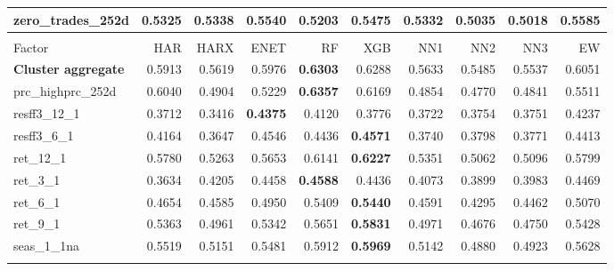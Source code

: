 \begin{longtable}{>{\raggedright\arraybackslash}p{2.6cm}rrrrrrrrr}
zero\_trades\_252d & 0.5325 & \cellcolor{blue!10}0.5338 & \cellcolor{blue!10}0.5540 & 0.5203 & \cellcolor{blue!10}0.5475 & \cellcolor{blue!10}0.5332 & 0.5035 & 0.5018 & \textbf{\cellcolor{blue!10}0.5585} \\
\hline
\multicolumn{10}{@{}l}{\textit{Panel F. Momentum}} \\
\hline
Factor & HAR & HARX & ENET & RF & XGB & NN1 & NN2 & NN3 & EW \\
\hline
\textbf{Cluster aggregate} & 0.5913 & 0.5619 & \cellcolor{blue!10}0.5976 & \textbf{\cellcolor{blue!10}0.6303} & \cellcolor{blue!10}0.6288 & 0.5633 & 0.5485 & 0.5537 & \cellcolor{blue!10}0.6051 \\
prc\_highprc\_252d & 0.6040 & 0.4904 & 0.5229 & \textbf{\cellcolor{blue!10}0.6357} & \cellcolor{blue!10}0.6169 & 0.4854 & 0.4770 & 0.4841 & 0.5511 \\
resff3\_12\_1 & 0.3712 & 0.3416 & \textbf{\cellcolor{blue!10}0.4375} & \cellcolor{blue!10}0.4120 & \cellcolor{blue!10}0.3776 & \cellcolor{blue!10}0.3722 & \cellcolor{blue!10}0.3754 & \cellcolor{blue!10}0.3751 & \cellcolor{blue!10}0.4237 \\
resff3\_6\_1 & 0.4164 & 0.3647 & \cellcolor{blue!10}0.4546 & \cellcolor{blue!10}0.4436 & \textbf{\cellcolor{blue!10}0.4571} & 0.3740 & 0.3798 & 0.3771 & \cellcolor{blue!10}0.4413 \\
ret\_12\_1 & 0.5780 & 0.5263 & 0.5653 & \cellcolor{blue!10}0.6141 & \textbf{\cellcolor{blue!10}0.6227} & 0.5351 & 0.5062 & 0.5096 & \cellcolor{blue!10}0.5799 \\
ret\_3\_1 & 0.3634 & \cellcolor{blue!10}0.4205 & \cellcolor{blue!10}0.4458 & \textbf{\cellcolor{blue!10}0.4588} & \cellcolor{blue!10}0.4436 & \cellcolor{blue!10}0.4073 & \cellcolor{blue!10}0.3899 & \cellcolor{blue!10}0.3983 & \cellcolor{blue!10}0.4469 \\
ret\_6\_1 & 0.4654 & 0.4585 & \cellcolor{blue!10}0.4950 & \cellcolor{blue!10}0.5409 & \textbf{\cellcolor{blue!10}0.5440} & 0.4591 & 0.4295 & 0.4462 & \cellcolor{blue!10}0.5070 \\
ret\_9\_1 & 0.5363 & 0.4961 & 0.5342 & \cellcolor{blue!10}0.5651 & \textbf{\cellcolor{blue!10}0.5831} & 0.4971 & 0.4676 & 0.4750 & \cellcolor{blue!10}0.5428 \\
seas\_1\_1na & 0.5519 & 0.5151 & 0.5481 & \cellcolor{blue!10}0.5912 & \textbf{\cellcolor{blue!10}0.5969} & 0.5142 & 0.4880 & 0.4923 & \cellcolor{blue!10}0.5628 \\
\hline
\multicolumn{10}{@{}l}{\textit{Panel G. Profit Growth}} \\

\end{longtable}
